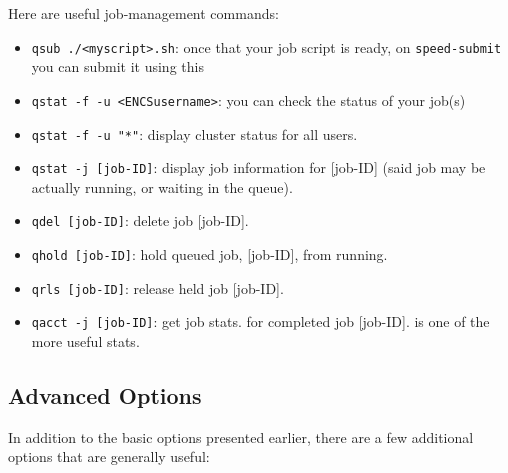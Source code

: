 \documentclass{easychair}
\begin{document}
Here are useful job-management commands: 

\begin{itemize}
\item
\texttt{qsub ./<myscript>.sh}: once that your job script is ready,
on \texttt{speed-submit} you can submit it using this

\item
\texttt{qstat -f -u <ENCSusername>}: you can check the status of your job(s)

\item
\texttt{qstat -f -u "*"}: display cluster status for all users. 

\item
\texttt{qstat -j [job-ID]}: display job information for [job-ID] (said job may be actually running, or waiting in the queue). 

\item
\texttt{qdel [job-ID]}: delete job [job-ID]. 

\item
\texttt{qhold [job-ID]}: hold queued job, [job-ID], from running. 

\item
\texttt{qrls [job-ID]}: release held job [job-ID]. 

\item
\texttt{qacct -j [job-ID]}: get job stats. for completed job [job-ID].  is one of the more useful stats. 
\end{itemize}


\subsection{Advanced  Options}
\label{sect:qsub-options}

In addition to the basic  options presented earlier, there are a few additional options that are generally useful:
\end{document}
